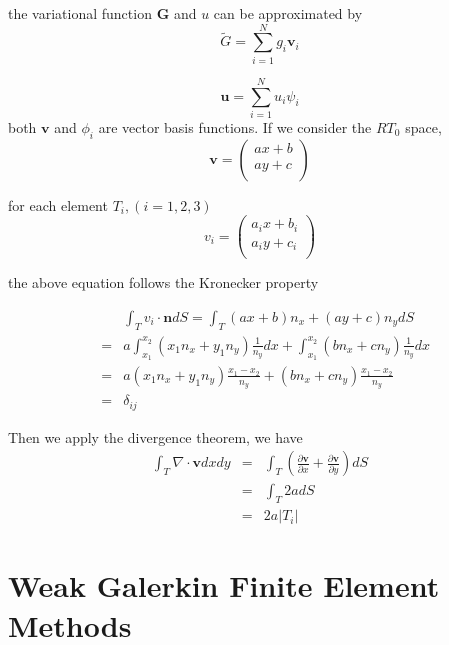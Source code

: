 the variational function $ \mathbf{G} $ and $ u $ can be approximated by 
\begin{equation}
\tilde{G} = \sum_{i = 1}^{N}g_{i} \mathbf{v}_{i}
\end{equation}

\begin{equation}
\mathbf{u} = \sum_{i = 1}^{N} u_{i} \psi_{i}
\end{equation}
both $ \mathbf{v} $ and $ \phi_{i} $ are vector basis functions. If we consider the $ RT_0 $ space, 
\begin{equation}
\mathbf{v} = \begin{pmatrix}
ax + b \\ ay + c\\
\end{pmatrix}
\end{equation}

for each element $ T_{i} , (i = 1, 2, 3)$
\begin{equation}
v_{i} = \begin{pmatrix}
a_{i} x + b_{i} \\ a_{i} y + c_{i}\\
\end{pmatrix}
\end{equation}

the above equation follows the Kronecker property \cite{davio1981kronecker}

\begin{eqnarray}
&&\int_{T} v_{i} \cdot \mathbf{n} dS = \int_{T} (ax + b)n_{x} + (ay + c)n_{y} dS\\
&=& a\int_{x_1}^{x_2} (x_1 n_x + y_1 n_y) \frac{1}{n_y} dx + \int_{x_1}^{x_2}(bn_x + cn_y) \frac{1}{n_y} dx  \\
&=& a(x_1 n_x + y_1 n_y) \frac{x_1 - x_2}{n_y} + (bn_x + cn_y) \frac{x_1 - x_2}{n_y} \\
&=& \delta_{ij}
\end{eqnarray}

Then we apply the divergence theorem, we have
\begin{eqnarray}
\int_{T} \nabla \cdot \mathbf{v} dx dy & = & \int_{T} (\frac{\partial \mathbf{v}}{\partial x} + \frac{\partial \mathbf{v}}{\partial y}) dS\\
&=& \int_{T} 2a dS \\
&=& 2a |T_{i}|
\end{eqnarray}


\section{Weak Galerkin Finite Element Methods}

